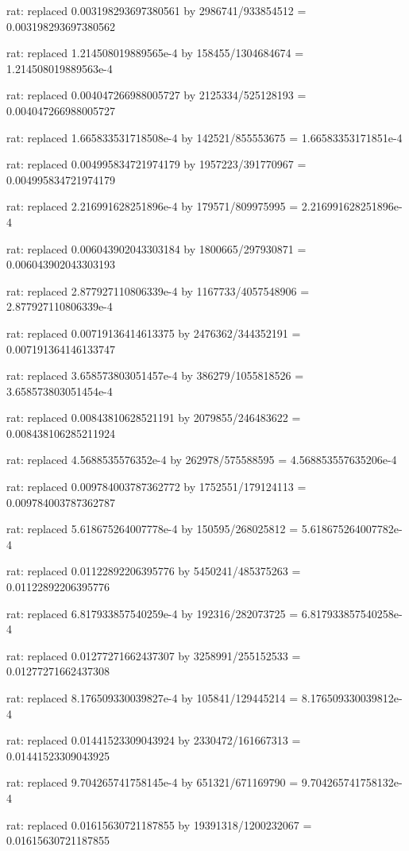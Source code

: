 \documentclass[a4paper,10pt]{article}
\begin{document}
\begin{eulernotebook}
\begin{eulercomment}
\begin{eulercomment}
\begin{eulercomment}
\begin{eulercomment}
\begin{eulercomment}
\begin{eulercomment}
\begin{eulercomment}
\begin{eulercomment}
\begin{eulercomment}
\begin{eulercomment}
\begin{eulercomment}
\begin{eulercomment}
\begin{eulercomment}
\begin{eulercomment}
\begin{eulercomment}
\begin{eulercomment}
\begin{euleroutput}
  rat: replaced 0.003198293697380561 by 2986741/933854512 = 0.003198293697380562
  
  rat: replaced 1.214508019889565e-4 by 158455/1304684674 = 1.214508019889563e-4
  
  rat: replaced 0.004047266988005727 by 2125334/525128193 = 0.004047266988005727
  
  rat: replaced 1.665833531718508e-4 by 142521/855553675 = 1.66583353171851e-4
  
  rat: replaced 0.004995834721974179 by 1957223/391770967 = 0.004995834721974179
  
  rat: replaced 2.216991628251896e-4 by 179571/809975995 = 2.216991628251896e-4
  
  rat: replaced 0.006043902043303184 by 1800665/297930871 = 0.006043902043303193
  
  rat: replaced 2.877927110806339e-4 by 1167733/4057548906 = 2.877927110806339e-4
  
  rat: replaced 0.00719136414613375 by 2476362/344352191 = 0.007191364146133747
  
  rat: replaced 3.658573803051457e-4 by 386279/1055818526 = 3.658573803051454e-4
  
  rat: replaced 0.00843810628521191 by 2079855/246483622 = 0.008438106285211924
  
  rat: replaced 4.5688535576352e-4 by 262978/575588595 = 4.568853557635206e-4
  
  rat: replaced 0.009784003787362772 by 1752551/179124113 = 0.009784003787362787
  
  rat: replaced 5.618675264007778e-4 by 150595/268025812 = 5.618675264007782e-4
  
  rat: replaced 0.01122892206395776 by 5450241/485375263 = 0.01122892206395776
  
  rat: replaced 6.817933857540259e-4 by 192316/282073725 = 6.817933857540258e-4
  
  rat: replaced 0.01277271662437307 by 3258991/255152533 = 0.01277271662437308
  
  rat: replaced 8.176509330039827e-4 by 105841/129445214 = 8.176509330039812e-4
  
  rat: replaced 0.01441523309043924 by 2330472/161667313 = 0.01441523309043925
  
  rat: replaced 9.704265741758145e-4 by 651321/671169790 = 9.704265741758132e-4
  
  rat: replaced 0.01615630721187855 by 19391318/1200232067 = 0.01615630721187855
  

\end{euleroutput}
\end{eulercomment}
\end{eulercomment}
\end{eulercomment}
\end{eulercomment}
\end{eulercomment}
\end{eulercomment}
\end{eulercomment}
\end{eulercomment}
\end{eulercomment}
\end{eulercomment}
\end{eulercomment}
\end{eulercomment}
\end{eulercomment}
\end{eulercomment}
\end{eulercomment}
\end{eulercomment}
\end{eulernotebook}
\end{document}
